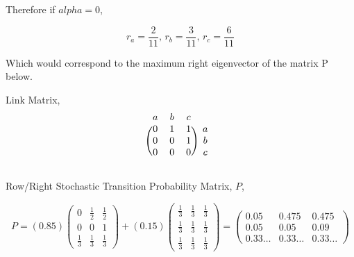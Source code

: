 \documentclass[12pt]{article}
\begin{document}
Therefore if $alpha=0$,

\begin{equation}
	\nonumber r_a = \frac{2}{11}, \, r_b = \frac{3}{11}, \, r_c = \frac{6}{11}
\end{equation}

Which would correspond to the maximum right eigenvector of the matrix P below.

%
%

Link Matrix,
\[
\begin{blockarray}{cccc}
a & b & c \\
\begin{block}{(ccc)c}
  0 & 1 & 1 & a \\
  0 & 0 & 1 & b \\
  0 & 0 & 0 & c \\
\end{block}
\end{blockarray}
\]

Row/Right Stochastic Transition Probability Matrix, $P$, 

$$
P = 
\left( 0.85 \right)
\begin{pmatrix} 
  0 	& \frac{1}{2} 	& \frac{1}{2}  \\
  0 	& 0 			& 1 		 \\
  \frac{1}{3} 	& \frac{1}{3} 	& \frac{1}{3}
\end{pmatrix}
 + 
\left( 0.15 \right)
\begin{pmatrix} 
  \frac{1}{3} 	& \frac{1}{3} 	& \frac{1}{3} \\
  \frac{1}{3} 	& \frac{1}{3} 	& \frac{1}{3} \\
  \frac{1}{3} 	& \frac{1}{3} 	& \frac{1}{3}
\end{pmatrix}
=
\begin{pmatrix} 
  0.05 	& 0.475 	& 0.475 \\
  0.05 	& 0.05 	& 0.09 \\
  0.33 \dots 	&  0.33 \dots 	&  0.33 \dots
\end{pmatrix}
$$
\end{document}
